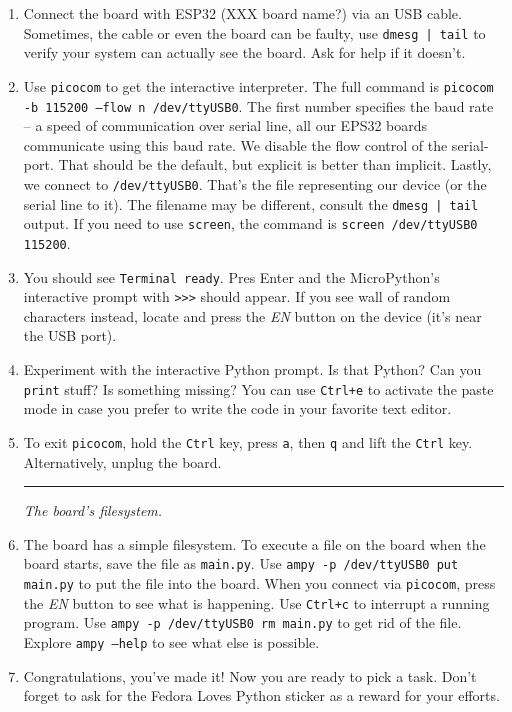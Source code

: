 \documentclass[a4paper,10pt]{article}
\newcommand\startsection[1]{
     \vspace{0.2ex}
    \hrule
    {\fontspec{Oxygen} \tiny
     \vspace{-1ex}
     \emph{#1}
     \vspace{-1.5em}
    }
}
\begin{document}
\begin{enumerate}[resume]

\item Connect the board with ESP32 (XXX board name?) via an USB cable.
      Sometimes, the cable or even the board can be faulty,
      use \texttt{dmesg | tail} to verify your system can actually see the board.
      Ask for help if it doesn't.

\item Use \texttt{picocom} to get the interactive interpreter.
      The full command is \texttt{picocom -b 115200 --flow n /dev/ttyUSB0}.
      The first number specifies the baud rate -- a speed of communication over serial line,
      all our EPS32 boards communicate using this baud rate.
      We disable the flow control of the serial-port.
      That should be the default,
      but explicit is better than implicit.
      Lastly, we connect to \texttt{/dev/ttyUSB0}.
      That's the file representing our device (or the serial line to it).
      The filename may be different, consult the \texttt{dmesg | tail} output.
      If you need to use \texttt{screen},
      the command is \texttt{screen /dev/ttyUSB0 115200}.

\item You should see \texttt{Terminal ready}.
      Pres Enter and the MicroPython's interactive prompt with \texttt{>>>} should appear.
      If you see wall of random characters instead,
      locate and press the \emph{EN} button on the device
      (it's near the USB port).

\item Experiment with the interactive Python prompt. Is that Python?
      Can you \texttt{print} stuff? Is something missing?
      You can use \texttt{Ctrl+e} to activate the paste mode
      in case you prefer to write the code in your favorite text editor.

\item To exit \texttt{picocom}, hold the \texttt{Ctrl} key, press \texttt{a},
      then \texttt{q} and lift the \texttt{Ctrl} key.
      Alternatively, unplug the board.

\startsection{The board's filesystem.}

\item The board has a simple filesystem.
      To execute a file on the board when the board starts,
      save the file as \texttt{main.py}.
      Use \texttt{ampy -p /dev/ttyUSB0 put main.py} to put the file into the board.
      When you connect via \texttt{picocom}, press the \emph{EN} button to see
      what is happening. Use \texttt{Ctrl+c} to interrupt a running program.
      Use \texttt{ampy -p /dev/ttyUSB0 rm main.py} to get rid of the file.
      Explore \texttt{ampy --help} to see what else is possible.

\item Congratulations, you've made it! Now you are ready to pick a task.
    Don't forget to ask for the Fedora Loves Python sticker as a reward for your efforts.

\end{enumerate}
\end{document}
